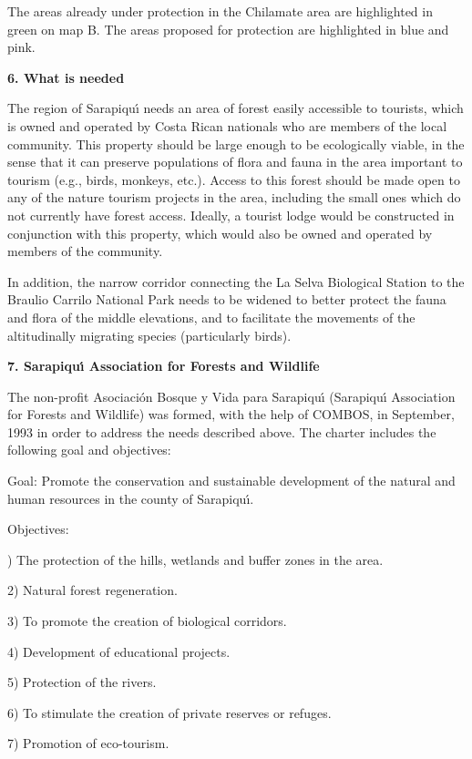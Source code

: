 The areas already under protection in the Chilamate area are
highlighted in green on map B.  The areas proposed for protection
are highlighted in blue and pink.

\LP
{\large {\bf 6.  What is needed}}
\eLP

The region of Sarapiqu\'{\i} needs an area of forest easily accessible
to tourists, which is owned and operated by Costa Rican nationals
who are members of the local community.  This property should be
large enough to be ecologically viable, in the sense that it can
preserve populations of flora and fauna in the area important to
tourism (e.g., birds, monkeys, etc.).  Access to this forest should
be made open to any of the nature tourism projects in the area,
including the small ones which do not currently have forest access.
Ideally, a tourist lodge would be constructed in conjunction with
this property, which would also be owned and operated by members of
the community.

In addition, the narrow corridor connecting the La Selva Biological
Station to the Braulio Carrilo National Park needs to be widened to
better protect the fauna and flora of the middle elevations, and to
facilitate the movements of the altitudinally migrating species
(particularly birds).

\LP
{\large {\bf 7.  Sarapiqu\'{\i} Association for Forests and Wildlife}}
\eLP

The non-profit Asociaci\'{o}n Bosque y Vida para Sarapiqu\'{\i}
(Sarapiqu\'{\i} Association for Forests and Wildlife) was formed,
with the help of COMBOS, in September, 1993 in order to address the
needs described above.  The charter includes the following goal and
objectives:

Goal: Promote the conservation and sustainable development of the
natural and human resources in the county of Sarapiqu\'{\i}.

\LP
Objectives:
\eLP

)   The protection of the hills, wetlands and buffer zones in the area.

2)   Natural forest regeneration.

3)   To promote the creation of biological corridors.

4)   Development of educational projects.

5)   Protection of the rivers.

6)   To stimulate the creation of private reserves or refuges.

7)   Promotion of eco-tourism.

